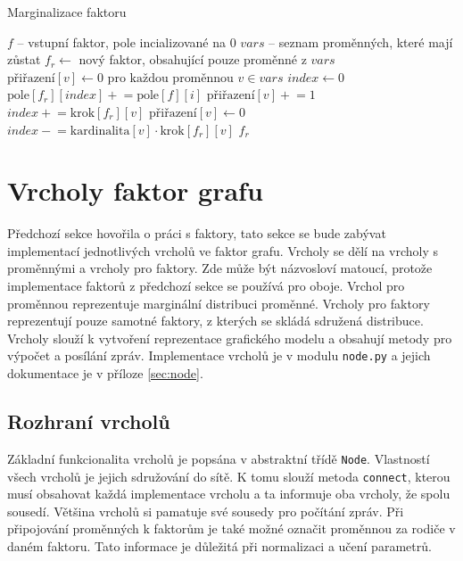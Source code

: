 \begin{algorithm}
\caption{Marginalizace faktoru}
\label{alg:marg}
\begin{algorithmic}
\State $f$ -- vstupní faktor, pole incializované na 0
\State $vars$ -- seznam proměnných, které mají zůstat
\State
\State $f_r \gets$ nový faktor, obsahující pouze proměnné z $vars$
\State $\text{přiřazení}[v] \gets 0 \text{ pro každou proměnnou } v \in vars$
\State $index \gets 0$ 
\State
{}
	\State $\text{pole}[f_r][index] \mathrel{+}= \text{pole}[f][i]$
	\State
			\State $\text{přiřazení}[v] \mathrel{+}= 1$
			\State $index \mathrel{+}= \text{krok}[f_r][v]$
		\EndIf
		\State
			\State $\text{přiřazení}[v] \gets 0$
			\State $index \mathrel{-}= \text{kardinalita}[v] \cdot \text{krok}[f_r][v]$
		\EndIf
	\EndFor
\EndFor
\State \Return $f_r$
\EndFunction
\end{algorithmic}
\end{algorithm}

\section{Vrcholy faktor grafu}

Předchozí sekce hovořila o práci s faktory, tato sekce se bude zabývat implementací jednotlivých vrcholů ve faktor grafu.
Vrcholy se dělí na vrcholy s proměnnými a vrcholy pro faktory.
Zde může být názvosloví matoucí, protože implementace faktorů z předchozí sekce se používá pro oboje.
Vrchol pro proměnnou reprezentuje marginální distribuci proměnné.
Vrcholy pro faktory reprezentují pouze samotné faktory, z kterých se skládá sdružená distribuce.
Vrcholy slouží k vytvoření reprezentace grafického modelu a obsahují metody pro výpočet a posílání zpráv.
Implementace vrcholů je v modulu \texttt{node.py} a jejich dokumentace je v příloze \ref{sec:node}. 

\subsection{Rozhraní vrcholů}

Základní funkcionalita vrcholů je popsána v abstraktní třídě \texttt{Node}.
Vlastností všech vrcholů je jejich sdružování do sítě.
K tomu slouží metoda \texttt{connect}, kterou musí obsahovat každá implementace vrcholu a ta informuje oba vrcholy, že spolu sousedí.
Většina vrcholů si pamatuje své sousedy pro počítání zpráv.
Při připojování proměnných k faktorům je také možné označit proměnnou za rodiče v daném faktoru.
Tato informace je důležitá při normalizaci a učení parametrů.

